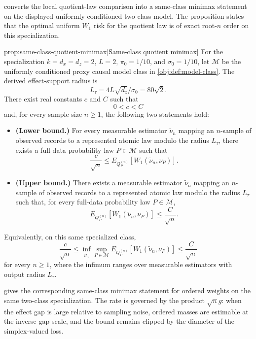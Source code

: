  converts the local quotient-law comparison into a same-class minimax statement on the displayed uniformly conditioned two-class model. The proposition states that the optimal uniform \(W_1\) risk for the quotient law is of exact root-\(n\) order on this specialization.

\begin{propositionv}{prop:same-class-quotient-minimax}[Same-class quotient minimax]
For the specialization \(k=d_x=d_z=2\), \(L=2\), \(\pi_0=1/10\), and \(\sigma_0=1/10\), let \(\mathcal M\) be the uniformly conditioned proxy causal model class in \cref{obj:def:model-class}.  The derived effect-support radius is
\[
L_\tau=4L\sqrt{d_z}/\sigma_0=80\sqrt 2 .
\]
There exist real constants \(c\) and \(C\) such that
\[
0<c<C
\]
and, for every sample size \(n\ge 1\), the following two statements hold:
\begin{itemize}
\item \textbf{(Lower bound.)} For every measurable estimator \(\widetilde\nu_n\) mapping an \(n\)-sample of observed records to a represented atomic law modulo the radius \(L_\tau\), there exists a full-data probability law \(P\in\mathcal M\) such that
\[
\frac{c}{\sqrt n}
\le
E_{Q_P^{(n)}}\!\left[
  W_1\!\left(\widetilde\nu_n,\nu_P\right)
\right].
\]
\item \textbf{(Upper bound.)} There exists a measurable estimator \(\widetilde\nu_n\) mapping an \(n\)-sample of observed records to a represented atomic law modulo the radius \(L_\tau\) such that, for every full-data probability law \(P\in\mathcal M\),
\[
E_{Q_P^{(n)}}\!\left[
  W_1\!\left(\widetilde\nu_n,\nu_P\right)
\right]
\le
\frac{C}{\sqrt n}.
\]
\end{itemize}
Equivalently, on this same specialized class,
\[
\frac{c}{\sqrt n}
\le
\inf_{\widetilde\nu_n}\sup_{P\in\mathcal M}
E_{Q_P^{(n)}}\!\left[
  W_1\!\left(\widetilde\nu_n,\nu_P\right)
\right]
\le
\frac{C}{\sqrt n}
\]
for every \(n\ge 1\), where the infimum ranges over measurable estimators with output radius \(L_\tau\).
\end{propositionv}

 gives the corresponding same-class minimax statement for ordered weights on the same two-class specialization. The rate is governed by the product \(\sqrt n g\): when the effect gap is large relative to sampling noise, ordered masses are estimable at the inverse-gap scale, and the bound remains clipped by the diameter of the simplex-valued loss.

